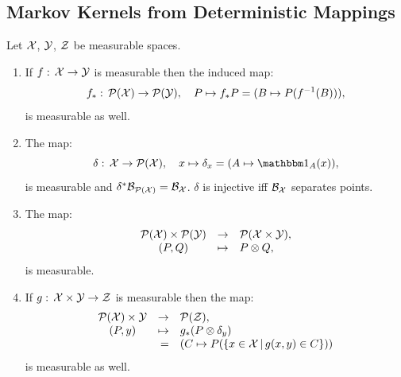 
\subsection{Markov Kernels from Deterministic Mappings}



\begin{Lem}
    \label{lem-maps-markov-kernel}
Let $\mathcal{X}$, $\mathcal{Y}$, $\mathcal{Z}$ be measurable spaces.
\begin{enumerate}
	\item If $f:\, \mathcal{X} \to \mathcal{Y}$ is measurable then the induced map:
        \[f_*:\, \mathcal{P}(\mathcal{X}) \to \mathcal{P}(\mathcal{Y}),\quad P \mapsto f_*P = (B \mapsto P(f^{-1}(B))), \]
	 is measurable as well.
	\item The map: 
        \[  \delta:\, \Xcal \to \Pcal(\Xcal),\quad x \mapsto \delta_x =(A \mapsto \I_A(x)), \]
	is measurable and $\delta^*\mathcal{B}_{\mathcal{P}(\mathcal{X})} = \mathcal{B}_{\mathcal{X}}$. $\delta$ is injective iff $\mathcal{B}_{\mathcal{X}}$ separates points.
	\item The map:
	 \[ \begin{array}{ccl} 
	 \mathcal{P}(\mathcal{X}) \times \mathcal{P}(\mathcal{Y}) &\to& 
	\mathcal{P}(\mathcal{X} \times \mathcal{Y}), \\
	( P, Q ) &\mapsto & P \otimes Q,
\end{array}\]
	is measurable.
	\item If $g:\,\mathcal{X} \times \mathcal{Y}  \to \mathcal{Z}$ is measurable then the map:
	\[ \begin{array}{crlll}
	   \mathcal{P}(\mathcal{X}) \times \mathcal{Y}  &\to& \mathcal{P}(\mathcal{Z}), \\
       (P, y) &\mapsto&  g_*(P\otimes \delta_y)\\
                 & =& ( C \mapsto P( \{ x \in \mathcal{X} \,|\, g(x,y) \in C \}) )
		\end{array}
    \]
	is measurable as well.
\end{enumerate}

\end{Lem}
